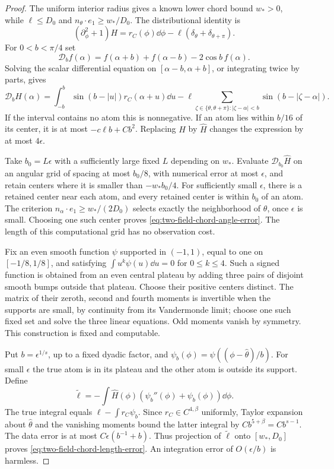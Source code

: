 \begin{proof}
The uniform interior radius gives a known lower chord bound
$w_*>0$, while $\ell\le D_0$ and
$n_\theta\cdot e_1\ge w_*/D_0$.  The distributional identity is
\[
 (\partial_\phi^2+1)H
   =r_C(\phi)\dd\phi-\ell(\delta_\theta+\delta_{\theta+\pi}).
\]
For $0<b<\pi/4$ set
\[
 \mathcal D_b f(\alpha)
     =f(\alpha+b)+f(\alpha-b)-2\cos b\,f(\alpha).
\]
Solving the scalar differential equation on $[\alpha-b,\alpha+b]$,
or integrating twice by parts, gives
\begin{equation}\label{eq:two-field-sine-difference}
 \mathcal D_b H(\alpha)
 =\int_{-b}^b\sin(b-|u|)r_C(\alpha+u)\dd u
    -\ell\sum_{\zeta\in\{\theta,\theta+\pi\}:|\zeta-\alpha|<b}
                                   \sin(b-|\zeta-\alpha|).
\end{equation}
If the interval contains no atom this is nonnegative.  If an atom
lies within $b/16$ of its center, it is at most
$-c\ell b+Cb^2$.  Replacing $H$ by $\widehat H$ changes the
expression by at most $4\epsilon$.

Take $b_0=L\epsilon$ with a sufficiently large fixed $L$ depending
on $w_*$.  Evaluate $\mathcal D_{b_0}\widehat H$ on an angular grid
of spacing at most $b_0/8$, with numerical error at most $\epsilon$,
and retain centers where it is smaller than $-w_*b_0/4$.
For sufficiently small $\epsilon$, there is a retained center near
each atom, and every retained center is within $b_0$ of an atom.
The criterion $n_\alpha\cdot e_1\ge w_*/(2D_0)$ selects exactly
the neighborhood of $\theta$, once $\epsilon$ is small.
Choosing one such center proves
\eqref{eq:two-field-chord-angle-error}.
The length of this computational grid has no observation cost.

Fix an even smooth function $\psi$ supported in $(-1,1)$, equal to
one on $[-1/8,1/8]$, and satisfying
$\int u^k\psi(u)\dd u=0$ for $0\le k\le4$.
Such a signed function is obtained from an even central plateau by
adding three pairs of disjoint smooth bumps outside that plateau.
Choose their positive centers distinct.  The matrix of their zeroth,
second and fourth moments is invertible when the supports are small,
by continuity from its Vandermonde limit; choose one such fixed set
and solve the three linear equations.  Odd moments vanish by symmetry.
This construction is fixed and computable.

Put $b=\epsilon^{1/s}$, up to a fixed dyadic factor, and
$\psi_b(\phi)=\psi((\phi-\widehat\theta)/b)$.
For small $\epsilon$ the true atom is in its plateau and the other
atom is outside its support.  Define
\[
 \widetilde\ell
       =-\int\widehat H(\phi)(\psi_b''(\phi)+\psi_b(\phi))\dd\phi.
\]
The true integral equals
$\ell-\int r_C\psi_b$.  Since $r_C\in C^{4,\beta}$ uniformly,
Taylor expansion about $\widehat\theta$ and the vanishing moments
bound the latter integral by $Cb^{5+\beta}=Cb^{s-1}$.
The data error is at most
$C\epsilon(b^{-1}+b)$.  Thus projection of
$\widetilde\ell$ onto $[w_*,D_0]$ proves
\eqref{eq:two-field-chord-length-error}.
An integration error of $O(\epsilon/b)$ is harmless.


\end{proof}
